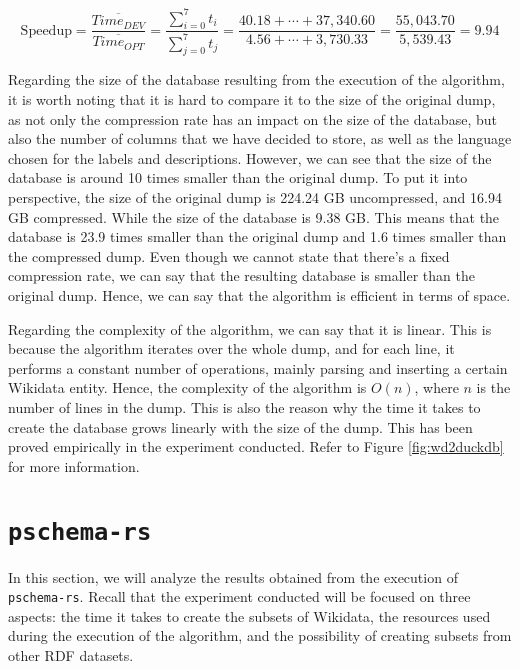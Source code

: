 \begin{equation}
    \text{Speedup} = \frac{\overline{Time_{DEV}}}{\overline{Time_{OPT}}} = \frac{\sum_{i=0}^{7}t_i}{\sum_{j=0}^{7}t_j} = \frac{40.18 + \cdots + 37,340.60}{4.56 + \cdots + 3,730.33} = \frac{55,043.70}{5,539.43} = 9.94
\end{equation}

Regarding the size of the database resulting from the execution of the algorithm, it is worth noting that it is hard to compare it to the size of the original dump, as not only the compression rate has an impact on the size of the database, but also the number of columns that we have decided to store, as well as the language chosen for the labels and descriptions. However, we can see that the size of the database is around 10 times smaller than the original dump. To put it into perspective, the size of the original dump is  224.24 GB uncompressed, and 16.94 GB compressed. While the size of the database is 9.38 GB. This means that the database is 23.9 times smaller than the original dump and 1.6 times smaller than the compressed dump. Even though we cannot state that there's a fixed compression rate, we can say that the resulting database is smaller than the original dump. Hence, we can say that the algorithm is efficient in terms of space.

Regarding the complexity of the algorithm, we can say that it is linear. This is because the algorithm iterates over the whole dump, and for each line, it performs a constant number of operations, mainly parsing and inserting a certain Wikidata entity. Hence, the complexity of the algorithm is $O(n)$, where $n$ is the number of lines in the dump. This is also the reason why the time it takes to create the database grows linearly with the size of the dump. This has been proved empirically in the experiment conducted. Refer to Figure \ref{fig:wd2duckdb} for more information.

\section{\texttt{pschema-rs}}

In this section, we will analyze the results obtained from the execution of \texttt{pschema-rs}. Recall that the experiment conducted will be focused on three aspects: the time it takes to create the subsets of Wikidata, the resources used during the execution of the algorithm, and the possibility of creating subsets from other RDF datasets.

